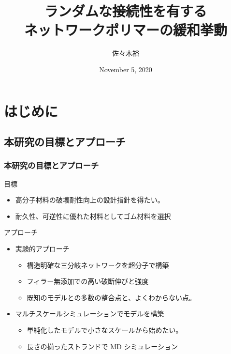 \documentclass[12pt, dvipdfmx]{beamer}
\title
[ランダムな接続性を有するネットワークポリマーの緩和挙動]
{ランダムな接続性を有する\\ネットワークポリマーの緩和挙動}
\author[東亞合成　佐々木]{佐々木裕}
\institute[東亞合成]{東亞合成}
\date{November 5, 2020}
\begin{document}
\begin{frame}\frametitle{}
	\titlepage
\end{frame}

\section{はじめに}
\subsection{本研究の目標とアプローチ}
\begin{frame}
    \frametitle{本研究の目標とアプローチ}
        \begin{block}{目標}
                \begin{itemize}
                    \item 高分子材料の破壊耐性向上の設計指針を得たい。
                    \item 耐久性、可逆性に優れた材料としてゴム材料を選択
                \end{itemize}
        \end{block}
		\begin{exampleblock}{アプローチ}
            \begin{itemize}
                \item 実験的アプローチ
                \begin{itemize}
                    \item 構造明確な\alert{三分岐}ネットワークを超分子で構築
                    \item フィラー無添加での\alert{高い破断伸びと強度}
                    \item 既知のモデルとの多数の整合点と、\alert{よくわからない点}。
                \end{itemize}
                \item マルチスケールシミュレーションで\color{red}モデル\color{black}を構築
                \begin{itemize}
                    \item 単純化したモデルで小さなスケールから始めたい。
                    \item \alert{長さの揃ったストランドで MD シミュレーション}
                \end{itemize}
            \end{itemize}
		\end{exampleblock}
\end{frame}
\end{document}
